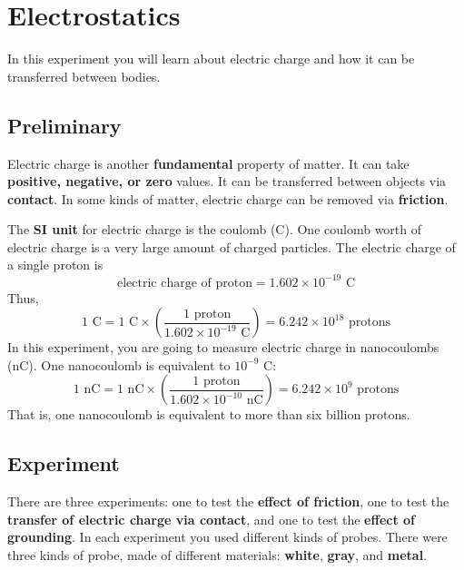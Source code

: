 \setcounter{chapter}{0}
\chapter{Electrostatics}
In this experiment you will learn about electric charge and how it can be transferred between bodies.
\section{Preliminary}
Electric charge is another \textbf{fundamental} property of matter. It can take \textbf{positive, negative, or zero} values. It can be transferred between objects via \textbf{contact}. In some kinds of matter, electric charge can be removed via \textbf{friction}.

The \textbf{SI unit} for electric charge is the coulomb (C). One coulomb worth of electric charge is a very large amount of charged particles. The electric charge of a single proton is
\begin{equation}
	\text{electric charge of proton} = 1.602 \times 10^{-19} \text{ C}
\end{equation}
Thus,
\begin{equation}
	1 \text{ C} = 1 \text{ C} \times \left(\frac{1 \text{ proton}}{1.602 \times 10^{-19} \text{ C}}\right) = 6.242 \times 10^{18} \text{ protons}
\end{equation}
In this experiment, you are going to measure electric charge in nanocoulombs (nC). One nanocoulomb is equivalent to $10^{-9}$ C:
\begin{equation}
	1 \text{ nC} = 1 \text{ nC} \times \left(\frac{1 \text{ proton}}{1.602 \times 10^{-10} \text{ nC}}\right) = 6.242 \times 10^{9} \text{ protons}
\end{equation}
That is, one nanocoulomb is equivalent to more than six billion protons.
\section{Experiment}
There are three experiments: one to test the \textbf{effect of friction}, one to test the \textbf{transfer of electric charge via contact}, and one to test the \textbf{effect of grounding}. In each experiment you used different kinds of probes. There were three kinds of probe, made of different materials: \textbf{white}, \textbf{gray}, and \textbf{metal}.
